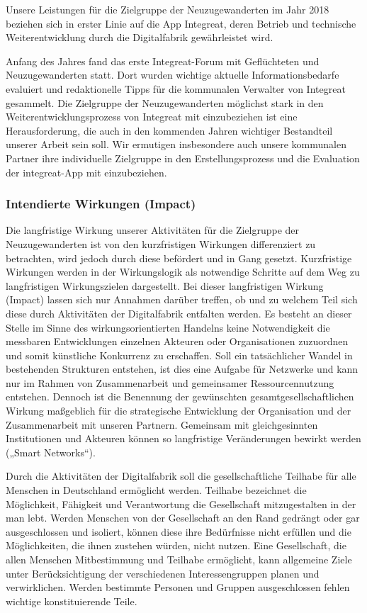 \documentclass[12pt, a4paper]{article} %
\begin{document}
Unsere Leistungen für die Zielgruppe der Neuzugewanderten im Jahr 2018
beziehen sich in erster Linie auf die App Integreat, deren Betrieb und
technische Weiterentwicklung durch die Digitalfabrik gewährleistet wird.

Anfang des Jahres fand das erste Integreat-Forum mit Geflüchteten und
Neuzugewanderten statt. Dort wurden wichtige aktuelle
Informationsbedarfe evaluiert und redaktionelle Tipps für die kommunalen
Verwalter von Integreat gesammelt. Die Zielgruppe der Neuzugewanderten
möglichst stark in den Weiterentwicklungsprozess von Integreat mit
einzubeziehen ist eine Herausforderung, die auch in den kommenden Jahren
wichtiger Bestandteil unserer Arbeit sein soll. Wir ermutigen
insbesondere auch unsere kommunalen Partner ihre individuelle Zielgruppe
in den Erstellungsprozess und die Evaluation der integreat-App mit
einzubeziehen.

\hypertarget{intendierte-wirkungen-impact}{%
\subsubsection{Intendierte Wirkungen
(Impact)}\label{intendierte-wirkungen-impact}}

Die langfristige Wirkung unserer Aktivitäten für die Zielgruppe der
Neuzugewanderten ist von den kurzfristigen Wirkungen differenziert zu
betrachten, wird jedoch durch diese befördert und in Gang gesetzt.
Kurzfristige Wirkungen werden in der Wirkungslogik als notwendige
Schritte auf dem Weg zu langfristigen Wirkungszielen dargestellt. Bei
dieser langfristigen Wirkung (Impact) lassen sich nur Annahmen darüber
treffen, ob und zu welchem Teil sich diese durch Aktivitäten der
Digitalfabrik entfalten werden. Es besteht an dieser Stelle im Sinne des
wirkungsorientierten Handelns keine Notwendigkeit die messbaren
Entwicklungen einzelnen Akteuren oder Organisationen zuzuordnen und
somit künstliche Konkurrenz zu erschaffen. Soll ein tatsächlicher Wandel
in bestehenden Strukturen entstehen, ist dies eine Aufgabe für Netzwerke
und kann nur im Rahmen von Zusammenarbeit und gemeinsamer
Ressourcennutzung entstehen. Dennoch ist die Benennung der gewünschten
gesamtgesellschaftlichen Wirkung maßgeblich für die strategische
Entwicklung der Organisation und der Zusammenarbeit mit unseren
Partnern. Gemeinsam mit gleichgesinnten Institutionen und Akteuren
können so langfristige Veränderungen bewirkt werden („Smart Networks“).

Durch die Aktivitäten der Digitalfabrik soll die gesellschaftliche
Teilhabe für alle Menschen in Deutschland ermöglicht werden. Teilhabe
bezeichnet die Möglichkeit, Fähigkeit und Verantwortung die Gesellschaft
mitzugestalten in der man lebt. Werden Menschen von der Gesellschaft an
den Rand gedrängt oder gar ausgeschlossen und isoliert, können diese
ihre Bedürfnisse nicht erfüllen und die Möglichkeiten, die ihnen
zustehen würden, nicht nutzen. Eine Gesellschaft, die allen Menschen
Mitbestimmung und Teilhabe ermöglicht, kann allgemeine Ziele unter
Berücksichtigung der verschiedenen Interessengruppen planen und
verwirklichen. Werden bestimmte Personen und Gruppen ausgeschlossen
fehlen wichtige konstituierende Teile.
\end{document}
